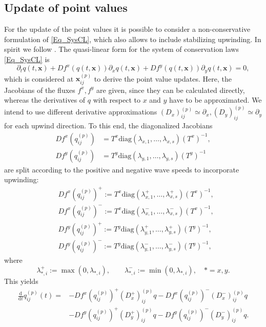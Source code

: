 \documentclass[12pt,a4paper]{article}
\begin{document}
\subsection{Update of point values}
\label{Chap_GenAF2DarbPV}
For the update of the point values it is possible to consider a non-conservative formulation of \eqref{Eq_SysCL}, which also allows to include stabilizing upwinding. In spirit we follow \cite{AB2023ExtensionAF, AB2023FEFV, ABK2025}. 
The quasi-linear form for the system of conservation laws \eqref{Eq_SysCL} is
\begin{equation}\label{Eq_QuasiLinCL}
	\partial_t q(t,\mathbf x)  +  Df^x(q(t,\mathbf x)) \partial_x q(t,\mathbf x) +  Df^y(q(t,\mathbf x) ) \partial_y q(t,\mathbf x)  = 0,
\end{equation}
which is considered at $\mathbf x_{ij}^{(p)}$ to derive the point value updates. 
Here, the Jacobians of the fluxes $f^x, f^y$ are given, since they can be calculated directly, whereas the derivatives of $q$ with respect to $x$ and $y$ have to be approximated. 
We intend to use different derivative approximations $(D_x)_{ij}^{(p)} \simeq \partial_x, (D_y)_{ij}^{(p)} \simeq \partial_y$ for each upwind direction. To this end, the diagonalized Jacobians 
\begin{align}
D f^x(q_{ij}^{(p)})&=T^x\mathrm{diag}(\lambda_{x,1},\dots, \lambda_{x,s})(T^x)^{-1},\\
D f^y(q_{ij}^{(p)})&=T^y\mathrm{diag}(\lambda_{y,1},\dots, \lambda_{y,s})(T^y)^{-1}
\end{align}
are split according to the positive and negative wave speeds to incorporate upwinding:
\begin{align*}
&D f^x(q_{ij}^{(p)})^{+} := T^x\mathrm{diag}(\lambda_{x,1}^{+},\dots , \lambda_{x,s}^{+})(T^x)^{-1},\\
&D f^x(q_{ij}^{(p)})^{-} := T^x\mathrm{diag}(\lambda_{x,1}^{-},\dots , \lambda_{x,s}^{-})(T^x)^{-1},\\
&D f^y(q_{ij}^{(p)})^{+} := T^y\mathrm{diag}(\lambda_{y,1}^{+},\dots , \lambda_{y,s}^{+})(T^y)^{-1},\\
&D f^y(q_{ij}^{(p)})^{-} := T^y\mathrm{diag}(\lambda_{y,1}^{-},\dots , \lambda_{y,s}^{-})(T^y)^{-1},
\end{align*}
where
\begin{equation*}
\lambda_{*,i}^{+} := \max(0, \lambda_{*,i}),  \qquad \lambda_{*,i}^{-} := \min(0, \lambda_{*,i}),\quad * = x, y.
\end{equation*}
This yields 
\begin{equation}
\label{Eq_PVUpdateJS}
\begin{aligned}
\frac{\mathrm d}{\mathrm d t}q_{ij}^{(p)} (t) =  &- Df^x(q_{ij}^{(p)})^{+}(D^{+}_x)_{ij}^{(p)} q - Df^x(q_{ij}^{(p)})^{-}(D^{-}_x)_{ij}^{({p})} q \\
&  -  Df^y(q_{ij}^{(p)})^{+}(D^{+}_y)_{ij}^{(p)} q -Df^y(q_{ij}^{(p)})^{-}(D^{-}_y)_{ij}^{(p)} q.
\end{aligned}
\end{equation}
\end{document}
